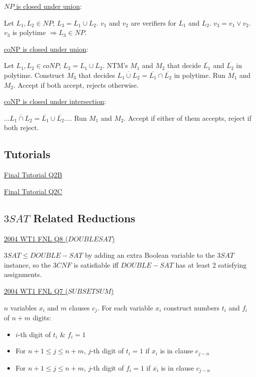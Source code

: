 \documentclass[10pt,landscape,a4paper]{article}
\begin{document}
\begin{multicols*}{3}
\underline{$NP$ is closed under union}:

Let $L_1, L_2 \in NP$; $L_3 = L_1 \cup L_2$. $v_1$ and $v_2$ are verifiers for $L_1$ and $L_2$. $v_3 = v_1 \vee v_2$. $v_3$ is polytime $\Rightarrow L_3 \in NP$.


\underline{coNP is closed under union}:

Let $L_1, L_2 \in coNP$; $L_3 = L_1 \cup L_2$. NTM's $M_1$ and $M_2$ that decide $\overline{L_1}$ and $\overline{L_2}$ in polytime. Construct $M_3$ that decides $\overline{L_1 \cup L_2} = \overline{L_1} \cap \overline{L_2}$ in polytime. Run $M_1$ and $M_2$. Accept if both accept, rejects otherwise.

\underline{coNP is closed under intersection}:

$\ldots \overline{L_1 \cap L_2} = \overline{L_1} \cup \overline{L_2} \ldots$. Run $M_1$ and $M_2$. Accept if either of them accepts, reject if both reject.


\subsection{Tutorials}

\underline{Final Tutorial Q2B}

\underline{Final Tutorial Q2C}



\subsection{$3SAT$ Related Reductions}

\underline{2004 WT1 FNL Q8 ($DOUBLESAT$)}

$3SAT \leq DOUBLE-SAT$ by adding an extra Boolean variable to the $3SAT$ instance, so the $3CNF$ is satisfiable iff $DOUBLE-SAT$ has at least 2 satisfying assignments.

\underline{2004 WT1 FNL Q7 ($SUBSETSUM$)}

$n$ variables $x_i$ and $m$ clauses $c_j$. For each variable $x_i$ construct numbers $t_i$ and $f_i$ of $n + m$ digits:

\begin{itemize}
    \item $i$-th digit of $t_i$ \& $f_i = 1$
    \item For $n + 1 \leq j \leq n + m$, $j$-th digit of $t_i = 1$ if $x_i$ is in clause $c_{j-n}$
    \item For $n + 1 \leq j \leq n + m$, $j$-th digit of $f_i = 1$ if $\overline{x_i}$ is in clause $c_{j-n}$
\end{itemize}


\end{multicols*}
\end{document}
